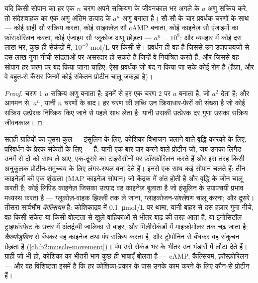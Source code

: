 \begin{theorem}[किसी सोपान में प्रवर्धन]\label{thm:b2:cell-signalling:amplification}
यदि किसी सोपान का हर एक $n$ चरण अपने सक्रियण के जीवनकाल भर अगले के
$a$ अणु सक्रिय करे, तो संदेशवाहक का एक अणु
अंतिम उत्पाद के $a^{n}$ अणु बनाता है। सौ-सौ के
चार प्रवर्धक चरणों के साथ --- कोई ग्राही सौ
 सक्रिय करता, कोई साइक्लेज़ सौ cAMP बनाता, कोई काइनेज़
सौ एंजाइमों का फ़ॉस्फ़ोरिलन करता, कोई एंजाइम सौ
ग्लूकोज़ अणु छोड़ता --- $a^{n} = 10^{8}$; और व्यवहार में कोई दस लाख भर,
कुछ ही सेकंडों में, $10^{-9}$ mol/L पर किसी  से। प्रवर्धन ही वह है
जिससे  उन उपापचयजों से दस लाख गुना नीची सांद्रताओं पर
असरदार हो सकते हैं जिन्हें वे नियंत्रित करते हैं, और जिससे वह सोपान
हर चरण पर बंद किया जाना चाहिए: ऐसा प्रवर्धक जो बंद न किया जा
सके कोई रोग है (हैज़ा, और वे बहुत-से कैंसर जिनमें कोई
संकेतन प्रोटीन चालू जकड़ा है)।
\end{theorem}
\begin{proof}
चरण 1 $a$ सक्रिय अणु बनाता है; इनमें से हर एक चरण 2 पर $a$
बनाता है, जो $a^{2}$ देता है; और आगमन से, $a^{n}$, यानी $n$ चरणों के बाद।
हर चरण की लब्धि उन क्रियाधार-फेरों की संख्या है जो कोई
सक्रिय उत्प्रेरक निष्क्रिय किए जाने से पहले साध लेता है: यानी उसकी उत्प्रेरक
दर गुणा उसका सक्रिय जीवनकाल।
\end{proof}

\begin{proposition}[ग्राही टाइरोसीन काइनेज़ और कैल्सियम]\label{prop:b2:cell-signalling:rtk}
सतही ग्राहियों का दूसरा कुल --- इंसुलिन के लिए, कोशिका-विभाजन चलाने वाले
वृद्धि कारकों के लिए, परिवर्धन के प्रेरक संकेतों के लिए ---
\emph{} हैं: यानी एक-बार-पार करने वाले
प्रोटीन जो, जब उनका लिगैंड उनमें से दो को साथ ले आए, एक-दूसरे का
टाइरोसीनों पर फ़ॉस्फ़ोरिलन करते हैं और इस तरह किसी
अनुकूलक प्रोटीन-समुच्चय के लिए लंगर-स्थल बना देते हैं। इनसे एक साथ कई सोपान
चलते हैं: तीन काइनेज़ों की एक शृंखला (MAP काइनेज़ सोपान) जो
केंद्रक में अंत होती है और वृद्धि के जीन चालू करती है; कोई लिपिड काइनेज़
जिसका उत्पाद वह काइनेज़ बुलाता है जो इंसुलिन के उपापचयी
प्रभाव मध्यस्थ करता है --- ग्लूकोज़-वाहक झिल्ली तक ले जाना, ग्लाइकोजन-संश्लेषण
चालू करना; और दूसरे। तीसरा सार्वभौम  \emph{कैल्सियम} है: कोशिकाद्रव में
\qty{0.1}{\micro mol/L} पर थामा, यानी बाहर से दस हज़ार गुना नीचे, वह
किसी संकेत या किसी वोल्टता से खुले वाहिकाओं से भीतर बाढ़ की तरह आता है, या
इनोसिटॉल ट्राइफ़ॉस्फ़ेट के उत्तर में अंतर्द्रव्यी जालिका से बाहर,
और मिलीसेकंडों में माइक्रोमोलर तक चढ़ जाता है; \emph{कैल्मोडुलिन} से बँधकर वह
काइनेज़ तथा पंप सक्रिय करता है, और ट्रोपोनिन से बँधकर वह
संकुचन छेड़ता है (\cref{ch:b2:muscle-movement})। पंप उसे सेकंड भर के भीतर उन
भंडारों में लौटा देते हैं। ग्राही जो भी हो, कोशिका का भीतरी भाग
कुछ ही भाषाएँ बोलता है --- cAMP, कैल्सियम, फ़ॉस्फ़ोरिलन --- और वह
विशिष्टता इसमें है कि हर कोशिका-प्रकार के पास उनके काम करने के लिए कौन-से
प्रोटीन हैं।
\end{proposition}

